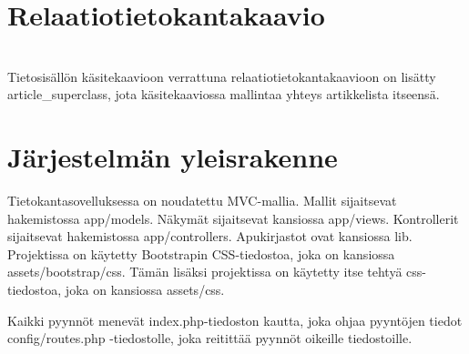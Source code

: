\documentclass[12pt]{article}
\begin{document}
  \section{Relaatiotietokantakaavio}
         \\
        Tietosisällön käsitekaavioon verrattuna relaatiotietokantakaavioon on lisätty article\_superclass, jota käsitekaaviossa mallintaa yhteys artikkelista itseensä.
  \newpage

  \section{Järjestelmän yleisrakenne}
        Tietokantasovelluksessa on noudatettu MVC-mallia. Mallit sijaitsevat hakemistossa app/models. Näkymät sijaitsevat kansiossa app/views. Kontrollerit sijaitsevat hakemistossa app/controllers. Apukirjastot ovat kansiossa lib. Projektissa on käytetty Bootstrapin CSS-tiedostoa, joka on kansiossa assets/bootstrap/css. Tämän lisäksi projektissa on käytetty itse tehtyä css-tiedostoa, joka on kansiossa assets/css.

        Kaikki pyynnöt menevät index.php-tiedoston kautta, joka ohjaa pyyntöjen tiedot config/routes.php -tiedostolle, joka reitittää pyynnöt oikeille tiedostoille.

            
        
\end{document}
